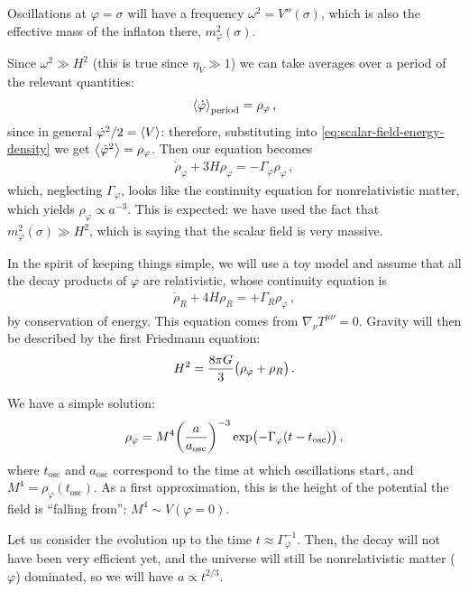 \documentclass[main.tex]{subfiles}
\begin{document}
Oscillations at \(\varphi = \sigma \) will have a frequency \(\omega^2 = V''(\sigma )\), which is also the effective mass of the inflaton there, \(m^2_\varphi (\sigma )\). 

Since \(\omega^2 \gg H^2\) (this is true since \(\eta _V \gg 1\)) we can take averages over a period of the relevant quantities: 
%
\begin{align}
\expval{\dot{\varphi}} _{\text{period}} = \rho _\varphi 
\,,
\end{align}
%
since in general \(\dot{\varphi}^2 / 2 = \expval{V}\): therefore, substituting into \eqref{eq:scalar-field-energy-density} we get \(\expval{\dot{\varphi}^2} = \rho _\varphi \). 
Then our equation becomes 
%
\begin{align}
\dot{\rho}_\varphi + 3 H \rho _\varphi =  - \Gamma _\varphi \rho _\varphi 
\,,
\end{align}
%
which, neglecting \(\Gamma _\varphi \), looks like the continuity equation for nonrelativistic matter, which yields \(\rho _\varphi \propto a^{-3}\). 
This is expected: we have used the fact that \(m^2_\varphi (\sigma ) \gg H^2\), which is saying that the scalar field is very massive. 

In the spirit of keeping things simple, we will use a toy model and assume that all the decay products of \(\varphi \) are relativistic, whose continuity equation is 
%
\begin{align}
\dot{\rho} _R + 4 H \rho _R = + \Gamma _R \rho _\varphi 
\,,
\end{align}
%
by conservation of energy. This equation comes from \(\nabla_\nu T^{\mu \nu } = 0\). 
Gravity will then be described by the first Friedmann equation: 
%
\begin{align}
H^2 = \frac{8 \pi G}{3} \qty(\rho _\varphi + \rho _R)
\,.
\end{align}

We have a simple solution: 
%
\begin{align}
\rho _\varphi = M^{4} \qty(\frac{a}{a _{\text{osc}}})^{-3} \exp(- \Gamma _\varphi \qty(t - t _{\text{osc}}))
\,,
\end{align}
%
where \(t _{\text{osc}}\) and \(a _{\text{osc}}\) correspond to the time at which oscillations start, and \(M^{4} = \rho _\varphi ( t _{\text{osc}})\).
As a first approximation, this is the height of the potential the field is ``falling from'': \(M^{4} \sim V(\varphi = 0)\). 

Let us consider the evolution up to the time \(t \approx \Gamma _\varphi^{-1}\). Then, the decay will not have been very efficient yet, and the universe will still be nonrelativistic matter (\(\varphi \)) dominated, so we will have \(a \propto t^{2/3}\).
\end{document}
